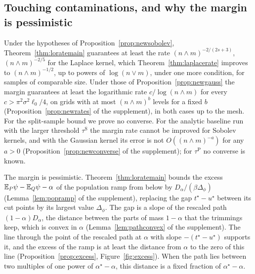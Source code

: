 \subsection{Touching contaminations, and why the margin is pessimistic}
\label{sec:touching}

Under the hypotheses of Proposition~\ref{prop:newsobolev}, Theorem~\ref{thm:loratemain} guarantees at least the rate
$(n\wedge m)^{-2/(2s+3)}$, $(n\wedge m)^{-2/5}$ for the Laplace kernel, which Theorem~\ref{thm:laplacerate} improves to
$(n\wedge m)^{-1/2}$, up to powers of $\log(n\vee m)$, under one more condition, for samples of comparable size. Under those of Proposition~\ref{prop:newgauss} the margin
guarantees at least the logarithmic rate $c/\log(n\wedge m)$ for every $c>\pi^2\sigma^2\ell_0/4$, on grids with at
most $(n\wedge m)^b$ levels for a fixed $b$ (Proposition~\ref{prop:newrates} of the supplement), in both cases up to the
mesh. For the split-sample bound we prove no converse. For the analytic baseline run with the larger threshold
$\tau^{\mathrm S}$ the margin rate cannot be improved for Sobolev kernels, and with the Gaussian kernel its error is
not $O((n\wedge m)^{-a})$ for any $a>0$ (Proposition~\ref{prop:newconverse} of the supplement); for
$\tau^{\mathrm P}$ no converse is known.

The margin is pessimistic. Theorem~\ref{thm:loratemain} bounds the excess $\mathbb{E}_P\psi-\mathbb{E}_Q\psi-\alpha$ of the population
ramp from below by $D_\alpha/(\beta\Delta_\phi)$ (Lemma~\ref{lem:popramp} of the supplement), replacing the gap
$t^\star-u^\star$ between its cut points by its largest value $\Delta_\phi$. The gap is a slope of the rescaled
path $(1-\alpha)D_\alpha$, the distance between the parts of mass $1-\alpha$ that the trimmings keep, which is convex in
$\alpha$ (Lemma~\ref{lem:pathconvex} of the supplement). The line through the point of the rescaled path at $\alpha$
with slope $-(t^\star-u^\star)$ supports it, and the excess of the ramp is at least the distance from $\alpha$ to the
zero of this line (Proposition~\ref{prop:excess}, Figure~\ref{fig:excess}). When the path lies between two multiples of one power of
$\alpha^\star-\alpha$, this distance is a fixed fraction of $\alpha^\star-\alpha$.

